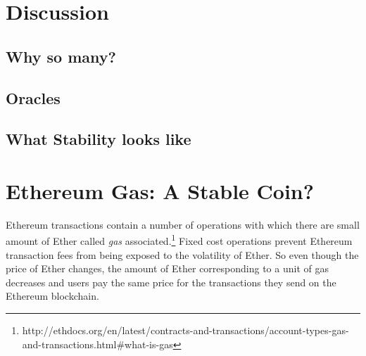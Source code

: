 
\section{Discussion}

\subsection{Why so many?}


\subsection{Oracles}

\subsection{What Stability looks like}\label{sec:stability}


\section {Ethereum Gas: A Stable Coin?}\label{sec:GasInvs}

Ethereum transactions contain a number of operations with which there are small amount of Ether called \textit{gas} associated.\footnote{http://ethdocs.org/en/latest/contracts-and-transactions/account-types-gas-and-transactions.html\#what-is-gas} Fixed cost operations prevent Ethereum transaction fees from being exposed to the volatility of Ether. So even though the price of Ether changes, the amount of Ether corresponding to a unit of gas decreases and users pay the same price for the transactions they send on the Ethereum blockchain. \par

